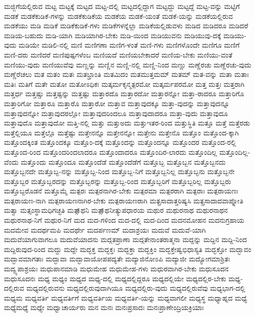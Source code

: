 {ಮಜ್ಜಿಗೆಯಲ್ಲಿರುವ
ಮಟ್ಟ
ಮಟ್ಟಕ್ಕೆ
ಮಟ್ಟದ
ಮಟ್ಟ-ದಲ್ಲಿ
ಮಟ್ಟದಲ್ಲಿದ್ದಾಗ
ಮಟ್ಟದ್ದು
ಮಟ್ಟದ್ದೆ
ಮಟ್ಟ-ವನ್ನು
ಮಟ್ಟಿಗೆ
ಮಡಕೆ
ಮಡಕೆಕುಡಿಕೆ-ಗಳನ್ನು
ಮಡಕೆಕುಡಿಕೆಯ
ಮಡಕೆಯ
ಮಡಕೆ-ಯಂತೆ
ಮಡಕೆ-ಯನ್ನು
ಮಡಕೆಯಲ್ಲಿರುವ
ಮಡಕೆಯು
ಮಡಿ
ಮಡಿಕೆ
ಮಡಿಕೆಕುಡಿಕೆ-ಗಳು
ಮಡಿಕೆಗಳನ್ನೆಲ್ಲಾ
ಮಡಿಕೆಯಲ್ಲಿಡುವಳು
ಮಡಿದ
ಮಡಿದರೂ
ಮಡಿದರೆ
ಮಡಿಯ-ಬಹುದು
ಮಡಿ-ಯಾಗಿ
ಮಡಿಯಾಗಿರ-ಬೇಕು
ಮಡಿ-ಯಿಂದ
ಮಡಿಯುವನು
ಮಡಿಯುವು-ದಕ್ಕೆ
ಮಡಿಯು-ವುದು
ಮಡಿಯೇ
ಮಡಿಲಿ-ನಲ್ಲಿ
ಮಣಿ
ಮಣಿಗಣಾ
ಮಣಿಗ-ಳಂತೆ
ಮಣಿ-ಗಳು
ಮಣಿಗಳೊಂದೇ
ಮಣಿಗೂ
ಮಣಿಗೆ
ಮಣಿ-ದರು
ಮಣಿದರೆ
ಮಣಿಪುಷ್ಪಗಳೆಂಬ
ಮಣಿಯದೆ
ಮಣಿಯಬೇಕಾದರೆ
ಮಣಿಯ-ಬೇಕು
ಮಣಿಯು-ವಂತೆ
ಮಣಿಯು-ವುದು
ಮಣಿಯುವೆವು
ಮಣ್ಣನ್ನು
ಮಣ್ಣಿನ
ಮಣ್ಣಿ-ನಲ್ಲಿ
ಮಣ್ಣಿ-ನಿಂದ
ಮಣ್ಣು
ಮಣ್ಣೆರಚು
ಮಣ್ಣೆರಚು-ವುದು
ಮಣ್ಣೆರೆಚಲು
ಮತ
ಮತಂ
ಮತಃ
ಮತಭ್ರಾಂತಿ
ಮತಮಿದಂ
ಮತಮುತ್ತಮಮ್
ಮತಮ್
ಮತ-ವನ್ನು
ಮತಾ
ಮತಾಃ
ಮತಿಃ
ಮತಿಗೆ
ಮತೇ
ಮತೋ
ಮತೋಽಧಿಕಃ
ಮತ್ಕರ್ಮಕೃನ್ಮತ್ಪರಮೋ
ಮತ್ಕರ್ಮಪರಮೋ
ಮತ್ತ
ಮತ್ತಃ
ಮತ್ತರಾಗಿ
ಮತ್ತರ್ಧ
ಮತ್ತಷ್ಚು
ಮತ್ತಷ್ಟನ್ನು
ಮತ್ತಷ್ಟು
ಮತ್ತಾರದೊ
ಮತ್ತಾರದೋ
ಮತ್ತಾರನ್ನೋ
ಮತ್ತಾ-ರಾದರೂ
ಮತ್ತಾರಿಗೊ
ಮತ್ತಾರಿಗೋ
ಮತ್ತಾರೂ
ಮತ್ತಾರೊ
ಮತ್ತಾರೋ
ಮತ್ತಾವ
ಮತ್ತಾವುದಕ್ಕೂ
ಮತ್ತಾ-ವುದನ್ನು
ಮತ್ತಾವುದನ್ನೂ
ಮತ್ತಾವುದನ್ನೋ
ಮತ್ತಾವುದರಲ್ಲೋ
ಮತ್ತಾವುದರಿಂದಲೂ
ಮತ್ತಾವುದಾದರೂ
ಮತ್ತಾ-ವುದು
ಮತ್ತಾವುದೂ
ಮತ್ತಾವುದೊ
ಮತ್ತಾವುದೋ
ಮತ್ತಿ-ನಲ್ಲಿ
ಮತ್ತು
ಮತ್ತುಅದು
ಮತ್ತುಇತರ-ರಿಂದ
ಮತ್ತುಸ್ಥಿತಿ
ಮತ್ತೂ
ಮತ್ತೆ
ಮತ್ತೆರಡು
ಮತ್ತೆಲ್ಲಿಯೂ
ಮತ್ತೆಲ್ಲೊ
ಮತ್ತೆಷ್ಟು
ಮತ್ತೇನನ್ನೊ
ಮತ್ತೇನನ್ನೋ
ಮತ್ತೇನು
ಮತ್ತೇನೊ
ಮತ್ತೊಂ
ಮತ್ತೊಂದ-ಕ್ಕಾಗಿ
ಮತ್ತೊಂದಕ್ಕಿಂತ
ಮತ್ತೊಂದಕ್ಕೂ
ಮತ್ತೊಂ-ದಕ್ಕೆ
ಮತ್ತೊಂದನ್ನು
ಮತ್ತೊಂದನ್ನೂ
ಮತ್ತೊಂದರ
ಮತ್ತೊಂದ-ರಲ್ಲಿ
ಮತ್ತೊಂದ-ರಿಂದ
ಮತ್ತೊಂದರಿಂದಲಾದರೂ
ಮತ್ತೊಂದಾದರೂ
ಮತ್ತೊಂದಿರ-ಲಾರದು
ಮತ್ತೊಂದಿಲ್ಲ
ಮತ್ತೊಂದಿಲ್ಲ-ವೆಂದು
ಮತ್ತೊಂದು
ಮತ್ತೊಂದೂ
ಮತ್ತೊಂದೆಡೆ
ಮತ್ತೊಂದೆಡೆಗೆ
ಮತ್ತೊಬ್ಬ
ಮತ್ತೊಬ್ಬನ
ಮತ್ತೊಬ್ಬನದು
ಮತ್ತೊಬ್ಬನದೇ
ಮತ್ತೊಬ್ಬ-ನನ್ನು
ಮತ್ತೊಬ್ಬ-ನಿಂದ
ಮತ್ತೊಬ್ಬ-ನಿಗೆ
ಮತ್ತೊಬ್ಬನಿಲ್ಲ
ಮತ್ತೊಬ್ಬನು
ಮತ್ತೊಬ್ಬನೇ
ಮತ್ತೊಬ್ಬರ
ಮತ್ತೊಬ್ಬರದನ್ನು
ಮತ್ತೊಬ್ಬರನ್ನು
ಮತ್ತೊಬ್ಬ-ರಿಂದ
ಮತ್ತೊಬ್ಬರಿಗೆ
ಮತ್ತೊಬ್ಬರಿಲ್ಲ
ಮತ್ತೊಬ್ಬರು
ಮತ್ತೊಬ್ಬರೊಡನೆ
ಮತ್ತೊಮ್ಮೆ
ಮತ್ಪರಃ
ಮತ್ಪರನಾಗಿರ-ಬೇಕು
ಮತ್ಪರಮಾ
ಮತ್ಪರರಾಗಿ
ಮತ್ಪರಾಃ
ಮತ್ಪರಾಯಣಃ
ಮತ್ಪರಾಯಣ-ನಾಗಿ
ಮತ್ಪರಾಯಣನಾಗಿರ-ಬೇಕು
ಮತ್ಪರಾಯಣರಾಗಿ
ಮತ್ಪ್ರಸಾದಾತ್ತರಿಷ್ಯಸಿ
ಮತ್ಪ್ರಸಾದಾದವಾಪ್ನೋತಿ
ಮತ್ವಾ
ಮತ್ಸಂಸ್ಥಾಮಧಿಗಚ್ಛತಿ
ಮತ್ಸಾ್ಥನಿ
ಮತ್ಸಾ್ಥನೀತ್ಯುಪಧಾರಯ
ಮಥುರ
ಮಥುರನಾಥ
ಮಥುರನಾಥನ
ಮಥುರನಾಥ-ನಿಗೆ
ಮಥುರ-ನಿಗೆ
ಮದ
ಮದ-ಗಳಿಂದ
ಮದ-ದಲ್ಲಿ
ಮದ-ದಿಂದ
ಮದನಮೋಹನ
ಮದನುಗ್ರಹಾಯ
ಮದಮೇವ
ಮದರ್ಥಮಪಿ
ಮದರ್ಥೇ
ಮದರ್ಪಣಮ್
ಮದಾಶ್ರಯಃ
ಮದುವೆ
ಮದುವೆ-ಯಾಗಿ
ಮದುವೆಯಾಗುವಾಗಲೂ
ಮದುವೆಯಾದನು
ಮದ್ಗತಪ್ರಾಣಾ
ಮದ್ಗತೇನಾಂತರಾತ್ಮನಾ
ಮದ್ದನ್ನು
ಮದ್ದಿನ
ಮದ್ದಿ-ನಿಂದ
ಮದ್ದಿರುವುದ-ರಿಂದ
ಮದ್ದು
ಮದ್ದೇ
ಮದ್ಭಕ್ತ
ಮದ್ಭಕ್ತಃ
ಮದ್ಭಕ್ತಾ
ಮದ್ಭಕ್ತಿಂ
ಮದ್ಭಕ್ತೇಷ್ವಭಿಧಾಸ್ಯತಿ
ಮದ್ಭಕ್ತೋ
ಮದ್ಭಾವಂ
ಮದ್ಭಾವಮಾಗತಾಃ
ಮದ್ಭಾವಾ
ಮದ್ಭಾವಾಯೋಪಪದ್ಯತೇ
ಮದ್ಯಾಜಿನೋಽಪಿ
ಮದ್ಯಾಜೀ
ಮದ್ಯೋಗಮಾಶ್ರಿತಃ
ಮದ್ವ್ಯಪಾಶ್ರಯಃ
ಮಧುಪಾನಮಾಡಿ
ಮಧುಮೇಹ
ಮಧುಮೇಹ-ಗಳು
ಮಧುರವಾಗಿರ-ಬೇಕು
ಮಧುಸೂದನ
ಮಧುಸೂದನಃ
ಮಧ್ಯ
ಮಧ್ಯಂ
ಮಧ್ಯದ
ಮಧ್ಯ-ದಲ್ಲಿ
ಮಧ್ಯದಲ್ಲಿದ್ದರೂ
ಮಧ್ಯದಲ್ಲಿಯೇ
ಮಧ್ಯದಲ್ಲಿರ-ಬೇಕು
ಮಧ್ಯ-ದಲ್ಲಿರುವ
ಮಧ್ಯದಲ್ಲಿರುವನು
ಮಧ್ಯದಲ್ಲಿರುವುದಾಗಿಯೂ
ಮಧ್ಯದಲ್ಲಿರು-ವುದು
ಮಧ್ಯದಲ್ಲಿರುವೆವು
ಮಧ್ಯಭಾಗ-ದಲ್ಲಿ
ಮಧ್ಯಮ
ಮಧ್ಯವರ್ತಿ
ಮಧ್ಯವರ್ತಿಗೆ
ಮಧ್ಯವರ್ತಿಯ
ಮಧ್ಯವರ್ತಿ-ಯನ್ನು
ಮಧ್ಯವಾಗಲೀ
ಮಧ್ಯಸ್ಥ
ಮಧ್ಯಾಹ್ನದ
ಮಧ್ಯೆ
ಮಧ್ಯೆಮಧ್ಯೆ
ಮಧ್ಯೇ
ಮಧ್ವಾಚಾರ್ಯರು
ಮನ
ಮನಃ
ಮನಃಪ್ರಸಾದಃ
ಮನಃಪ್ರಾಣೇಂದ್ರಿಯಕ್ರಿಯಾಃ
}
